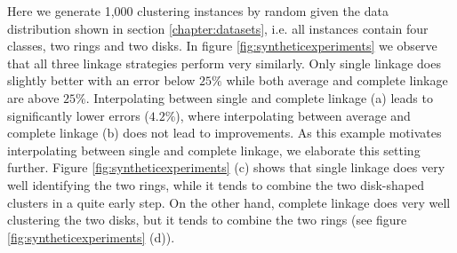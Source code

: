 Here we generate 1,000 clustering instances by random given the data distribution shown in section \ref{chapter:datasets}, i.e. all instances contain four classes, two rings and two disks. In figure \ref{fig:syntheticexperiments} we observe that all three linkage strategies perform very similarly. Only single linkage does slightly better with an error below $25\%$ while both average and complete linkage are above $25\%$. Interpolating between single and complete linkage (a) leads to significantly lower errors ($4.2\%$), where interpolating between average and complete linkage (b) does not lead to improvements. As this example motivates interpolating between single and complete linkage, we elaborate this setting further. Figure \ref{fig:syntheticexperiments} (c) shows that single linkage does very well identifying the two rings, while it tends to combine the two disk-shaped clusters in a quite early step. On the other hand, complete linkage does very well clustering the two disks, but it tends to combine the two rings (see figure \ref{fig:syntheticexperiments} (d)).

